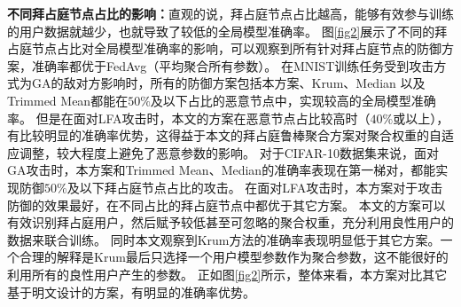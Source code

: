 \textbf{不同拜占庭节点占比的影响：}直观的说，拜占庭节点占比越高，能够有效参与训练的用户数据就越少，也就导致了较低的全局模型准确率。
图\ref{fig2}展示了不同的拜占庭节点占比对全局模型准确率的影响，可以观察到所有针对拜占庭节点的防御方案，准确率都优于FedAvg（平均聚合所有参数）。
在MNIST训练任务受到攻击方式为GA的敌对方影响时，所有的防御方案包括本方案、Krum、Median 以及 Trimmed Mean都能在$ 50\% $及以下占比的恶意节点中，实现较高的全局模型准确率。
但是在面对LFA攻击时，本文的方案在恶意节点占比较高时（$40\%$或以上），有比较明显的准确率优势，这得益于本文的拜占庭鲁棒聚合方案对聚合权重的自适应调整，较大程度上避免了恶意参数的影响。
对于CIFAR-10数据集来说，面对GA攻击时，本方案和Trimmed Mean、Median的准确率表现在第一梯对，都能实现防御$50\%$及以下拜占庭节点占比的攻击。
在面对LFA攻击时，本方案对于攻击防御的效果最好，在不同占比的拜占庭节点中都优于其它方案。
本文的方案可以有效识别拜占庭用户，然后赋予较低甚至可忽略的聚合权重，充分利用良性用户的数据来联合训练。
同时本文观察到Krum方法的准确率表现明显低于其它方案。一个合理的解释是Krum最后只选择一个用户模型参数作为聚合参数，这不能很好的利用所有的良性用户产生的参数。
正如图\ref{fig2}所示，整体来看，本方案对比其它基于明文设计的方案，有明显的准确率优势。

